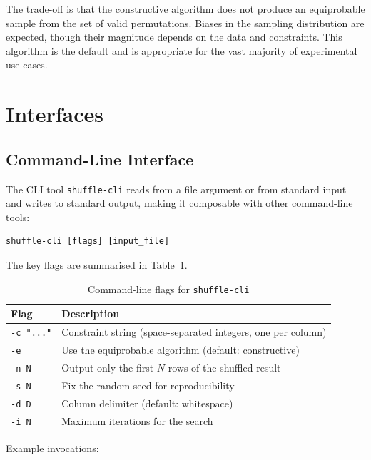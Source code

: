 \documentclass[doc,a4paper,biblatex]{apa7}
\begin{document}
The trade-off is that the constructive algorithm does not produce an
equiprobable sample from the set of valid permutations. Biases in the
sampling distribution are expected, though their magnitude depends on
the data and constraints. This algorithm is the default and is
appropriate for the vast majority of experimental use cases.

\section{Interfaces}
\label{sec:interfaces}

\subsection{Command-Line Interface}

The CLI tool \texttt{shuffle-cli} reads from a file argument or from
standard input and writes to standard output, making it composable with
other command-line tools:

\begin{lstlisting}
shuffle-cli [flags] [input_file]
\end{lstlisting}

\noindent
The key flags are summarised in Table~\ref{tab:flags}.

\begin{table}[ht]
\caption{Command-line flags for \texttt{shuffle-cli}}
\label{tab:flags}
\begin{tabular}{@{}ll@{}}
\toprule
Flag & Description \\
\midrule
\texttt{-c "..."} & Constraint string (space-separated integers, one per column) \\
\texttt{-e}       & Use the equiprobable algorithm (default: constructive) \\
\texttt{-n N}     & Output only the first $N$ rows of the shuffled result \\
\texttt{-s N}     & Fix the random seed for reproducibility \\
\texttt{-d D}     & Column delimiter (default: whitespace) \\
\texttt{-i N}     & Maximum iterations for the search \\
\bottomrule
\end{tabular}
\end{table}

\noindent
Example invocations:
\end{document}
